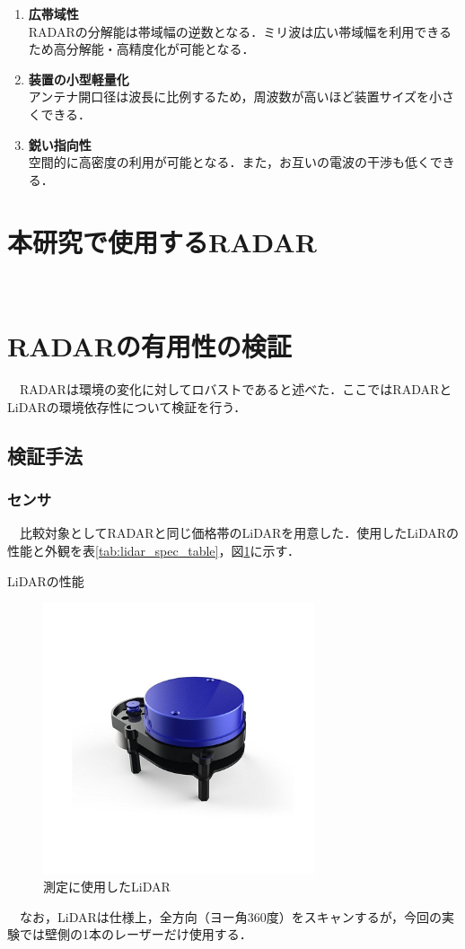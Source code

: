 \begin{enumerate}
    \item \textbf{広帯域性}\\
        RADARの分解能は帯域幅の逆数となる．ミリ波は広い帯域幅を利用できるため高分解能・高精度化が可能となる．
    \item \textbf{装置の小型軽量化}\\
        アンテナ開口径は波長に比例するため，周波数が高いほど装置サイズを小さくできる．
    \item \textbf{鋭い指向性}\\
        空間的に高密度の利用が可能となる．また，お互いの電波の干渉も低くできる．
\end{enumerate}


\section{本研究で使用するRADAR}
　

\section{RADARの有用性の検証}
　RADARは環境の変化に対してロバストであると述べた．ここではRADARとLiDARの環境依存性について検証を行う．

\subsection{検証手法}
\subsubsection{センサ}
　比較対象としてRADARと同じ価格帯のLiDARを用意した．使用したLiDARの性能と外観を表\ref{tab:lidar_spec_table}，図\ref{fig:lidar}に示す．\cite{lidar_datasheet}

\begin{table}[htbp]
    \centering
    \caption{LiDARの性能}
    
    \label{tab:lidar_spec_table}
\end{table}

\begin{figure}[H]
    \centering
    \includegraphics[width=8cm]{./fig/lidar.jpg}
    \caption{測定に使用したLiDAR}
    \label{fig:lidar}
\end{figure}
　なお，LiDARは仕様上，全方向（ヨー角360度）をスキャンするが，今回の実験では壁側の1本のレーザーだけ使用する．

